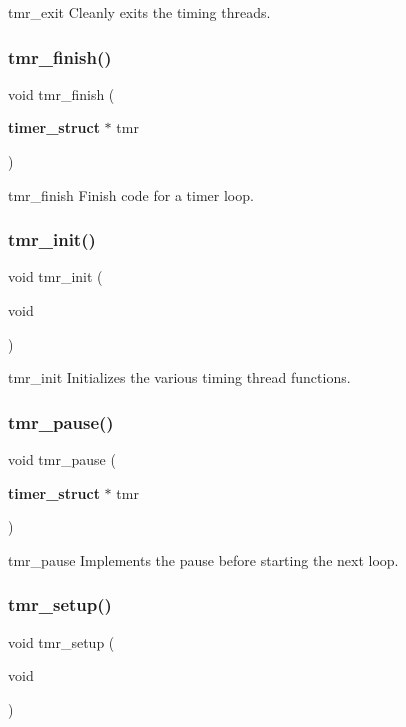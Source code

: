 tmr\+\_\+exit Cleanly exits the timing threads. \mbox{\label{timer_8h_ae824a7814ba064b1ce4d3a1d23016a43}} 
\subsubsection{tmr\+\_\+finish()}
{\footnotesize\ttfamily void tmr\+\_\+finish (\begin{DoxyParamCaption}\item[{\textbf{ timer\+\_\+struct} $\ast$}]{tmr }\end{DoxyParamCaption})}

tmr\+\_\+finish Finish code for a timer loop. \mbox{\label{timer_8h_ab1c0b33865cecb5eb30e493aec037a62}} 
\subsubsection{tmr\+\_\+init()}
{\footnotesize\ttfamily void tmr\+\_\+init (\begin{DoxyParamCaption}\item[{void}]{ }\end{DoxyParamCaption})}

tmr\+\_\+init Initializes the various timing thread functions. \mbox{\label{timer_8h_a56d31db4da2f4e7665daf5385f17b491}} 
\subsubsection{tmr\+\_\+pause()}
{\footnotesize\ttfamily void tmr\+\_\+pause (\begin{DoxyParamCaption}\item[{\textbf{ timer\+\_\+struct} $\ast$}]{tmr }\end{DoxyParamCaption})}

tmr\+\_\+pause Implements the pause before starting the next loop. \mbox{\label{timer_8h_af70d423299ac4b60d7ea5e132ef64cf5}} 
\subsubsection{tmr\+\_\+setup()}
{\footnotesize\ttfamily void tmr\+\_\+setup (\begin{DoxyParamCaption}\item[{void}]{ }\end{DoxyParamCaption})}

